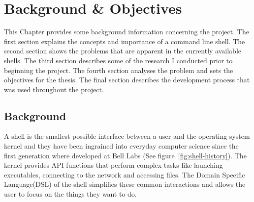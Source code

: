 \chapter{Background \& Objectives}






This Chapter provides some background information concerning the project.
The first section explains the concepts and importance of a command line shell.
The second section shows the problems that are apparent in the currently available shells.
The third section describes some of the research I conducted prior to beginning the project.
The fourth section analyses the problem and sets the objectives for the thesis.
The final section describes the development process that was used throughout the project.


\section{Background}
A shell is the smallest possible interface between a user and the operating system kernel and they have been ingrained into everyday computer science since the first generation where developed at Bell Labs (See figure~\ref{fig:shell-history}).
The kernel provides API functions that perform complex tasks like launching executables, connecting to the network and accessing files.
The Domain Specific Language(DSL) of the shell simplifies these common interactions and allows the user to focus on the things they want to do.

